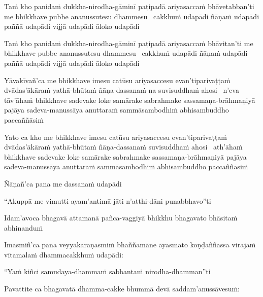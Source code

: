 \begin{pali-hang}
  Taṁ kho panidaṁ dukkha-nirodha-gāminī paṭipadā ariyasaccaṁ bhāvetabban'ti me bhikkhave pubbe ananussutesu dhammesu \breathmark\ cakkhuṁ udapādi ñāṇaṁ udapādi paññā udapādi vijjā udapādi āloko udapādi
\end{pali-hang}

\begin{pali-hang}
  Taṁ kho panidaṁ dukkha-nirodha-gāminī paṭipadā ariyasaccaṁ bhāvitan'ti me bhikkhave pubbe ananussutesu dhammesu \breathmark\ cakkhuṁ udapādi ñāṇaṁ udapādi paññā udapādi vijjā udapādi āloko udapādi
\end{pali-hang}

\begin{pali-hang}
  Yāvakīvañ'ca me bhikkhave imesu catūsu ariyasaccesu  evan'tiparivaṭṭaṁ dvādas'ākāraṁ yathā-bhūtaṁ ñāṇa-dassanaṁ na suvisuddhaṁ ahosi \breathmark\  n'eva tāv'āhaṁ bhikkhave sadevake loke samārake sabrahmake  sassamaṇa-brāhmaṇiyā pajāya sadeva-manussāya  anuttaraṁ sammāsambodhiṁ abhisambuddho paccaññāsiṁ
\end{pali-hang}

\begin{pali-hang}
  Yato ca kho me bhikkhave imesu catūsu ariyasaccesu  evan'tiparivaṭṭaṁ dvādas'ākāraṁ yathā-bhūtaṁ ñāṇa-dassanaṁ suvisuddhaṁ ahosi \breathmark\ ath'āhaṁ bhikkhave sadevake loke samārake sabrahmake  sassamaṇa-brāhmaṇiyā pajāya sadeva-manussāya  anuttaraṁ sammāsambodhiṁ abhisambuddho paccaññāsiṁ
\end{pali-hang}

Ñāṇañ'ca pana me dassanaṁ udapādi

\begin{pali-hang}
  ``Akuppā me vimutti ayam'antimā jāti n'atthi-dāni punabbhavo''ti
\end{pali-hang}

\begin{pali-hang}
  Idam'avoca bhagavā  attamanā pañca-vaggiyā bhikkhu bhagavato bhāsitaṁ abhinanduṁ
\end{pali-hang}

\begin{pali-hang}
  Imasmiñ'ca pana veyyākaraṇasmiṁ bhaññamāne  āyasmato koṇḍaññassa virajaṁ vītamalaṁ dhammacakkhuṁ udapādi:
\end{pali-hang}

``Yaṁ kiñci samudaya-dhammaṁ sabbantaṁ nirodha-dhamman''ti

\begin{pali-hang}
  Pavattite ca bhagavatā dhamma-cakke bhummā devā saddam'anussāvesuṁ:
\end{pali-hang}

